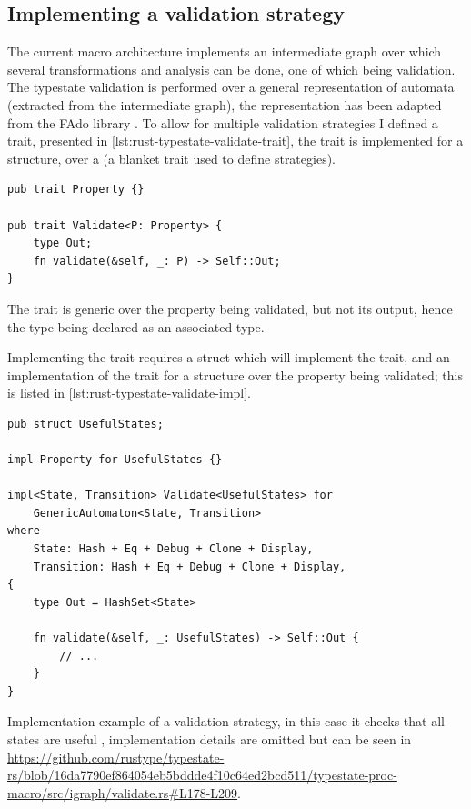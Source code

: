 \subsection{Implementing a validation strategy}\label{sec:validation:strategy}
The current macro architecture implements an intermediate graph over which several transformations and analysis can be done,
one of which being validation.
The typestate validation is performed over a general representation of automata (extracted from the intermediate graph),
the representation has been adapted from the FAdo library \autocite{Reis2002}.
To allow for multiple validation strategies I defined a  trait, presented in \autoref{lst:rust-typestate-validate-trait},
the trait is implemented for a structure, over a  (a blanket trait used to define strategies).

\begin{listing}
    \begin{verbatim}
pub trait Property {}

pub trait Validate<P: Property> {
    type Out;
    fn validate(&self, _: P) -> Self::Out;
}
    \end{verbatim}
    \caption{
        The  trait is generic over the property being validated,
        but not its output, hence the  type being declared as an associated type.
    }
    \label{lst:rust-typestate-validate-trait}
\end{listing}

Implementing the  trait requires a struct which will implement the  trait,
and an implementation of the  trait for a structure over the property being validated;
this is listed in \autoref{lst:rust-typestate-validate-impl}.

\begin{listing}
    \begin{verbatim}
pub struct UsefulStates;

impl Property for UsefulStates {}

impl<State, Transition> Validate<UsefulStates> for
    GenericAutomaton<State, Transition>
where
    State: Hash + Eq + Debug + Clone + Display,
    Transition: Hash + Eq + Debug + Clone + Display,
{
    type Out = HashSet<State>

    fn validate(&self, _: UsefulStates) -> Self::Out {
        // ...
    }
}
    \end{verbatim}
    \caption{
        Implementation example of a validation strategy,
        in this case it checks that all states are useful
        ,
        implementation details are omitted but can be seen in
        \url{https://github.com/rustype/typestate-rs/blob/16da7790ef864054eb5bddde4f10c64ed2bcd511/typestate-proc-macro/src/igraph/validate.rs\#L178-L209}.
    }
    \label{lst:rust-typestate-validate-impl}
\end{listing}

